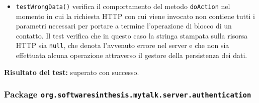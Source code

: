 \begin{itemize}
\begin{itemize}
\item \texttt{testWrongData()} verifica il comportamento del metodo \texttt{doAction} nel momento in cui la richiesta HTTP con cui viene invocato non contiene tutti i parametri necessari per portare a termine l'operazione di blocco di un contatto.
Il test verifica che in questo caso la stringa stampata sulla risorsa HTTP sia \texttt{null}, che denota l'avvenuto errore nel server e che non sia effettuata alcuna operazione attraverso il gestore della persistenza dei dati.

\end{itemize}
\textbf{Risultato del test:} superato con successo.

\end{itemize}


\subsubsection{Package \texttt{org.softwaresinthesis.mytalk.server.authentication}}
